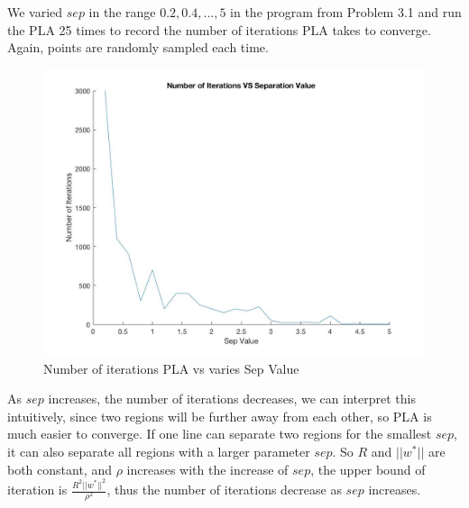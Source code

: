 \documentclass[12pt]{article}
\begin{document}
\newpage
{} \\\\
\indent We varied $sep$ in the range ${0.2,0.4,...,5}$ in the program from Problem 3.1 and run the PLA 25 times to record the number of iterations PLA takes to converge. Again, points are randomly sampled each time. 
\begin{figure}[H]
  \centering
  \includegraphics[scale = 0.35]{Pic2.jpg}
  \caption{Number of iterations PLA vs varies Sep Value}
  \label{fig:Pic2}
\end{figure}
\indent As $sep$ increases, the number of iterations decreases, we can interpret this intuitively, since two regions will be further away from each other, so PLA is much easier to converge. If one line can separate two regions for the smallest $sep$, it can also separate all regions with a larger parameter $sep$. So $R$ and $||w^*||$ are both constant, and $\rho$ increases with the increase of $sep$, the upper bound of iteration is $\displaystyle \frac{R^2||w^*||^2}{\rho^2}$, thus the number of iterations decrease as $sep$ increases.\\
\end{document}

